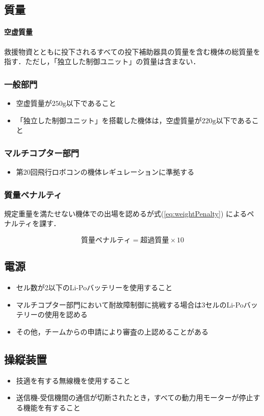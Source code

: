 \documentclass[a4paper,12pt,oneside]{jsarticle}
\begin{document}
\subsection{質量}
\paragraph{空虚質量} 救援物資とともに投下されるすべての投下補助器具の質量を含む機体の総質量を指す．ただし，「独立した制御ユニット」の質量は含まない．
\subsubsection{一般部門}
\begin{itemize}
  \item 空虚質量が$250\mathrm{g}$以下であること
  \item 「独立した制御ユニット」を搭載した機体は，空虚質量が$220\mathrm{g}$以下であること
\end{itemize}
\subsubsection{マルチコプター部門}
\begin{itemize}
  \item 第20回飛行ロボコンの機体レギュレーションに準拠する
\end{itemize}
\subsubsection{質量ペナルティ}
規定重量を満たせない機体での出場を認めるが式(\ref{eq:weightPenalty}) によるペナルティを課す．

\begin{equation}\label{eq:weightPenalty}
  質量ペナルティ = 超過質量 \times 10
\end{equation}
\subsection{電源}
\begin{itemize}
  \item セル数が2以下のLi-Poバッテリーを使用すること
  \item マルチコプター部門において耐故障制御に挑戦する場合は3セルのLi-Poバッテリーの使用を認める
  \item その他，チームからの申請により審査の上認めることがある
\end{itemize}
\subsection{操縦装置}
\begin{itemize}
  \item 技適を有する無線機を使用すること
  \item 送信機-受信機間の通信が切断されたとき，すべての動力用モーターが停止する機能を有すること
\end{itemize}
\end{document}

